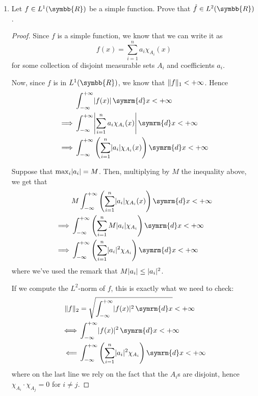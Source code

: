 \documentclass[a4paper, 12pt]{article}
\DeclarePairedDelimiter\abs{\lvert}{\rvert}%
\DeclarePairedDelimiter\norm{\lVert}{\rVert}%
\newcommand*\diff{\mathop{}\!\symrm{d}}
\newcommand*{\reals}{\symbb{R}}
\begin{document}
\begin{enumerate}
    \item Let \(f \in L^1 (\reals)\) be a simple function. Prove that \(\hat{f} \in L^2 (\reals)\).
    \begin{proof}
    Since \(f\) is a simple function, we know that we can write it as
    \[
        f(x) = \sum_{i = 1}^{n} a_i \chi_{A_i} (x)
    \]
    for some collection of disjoint measurable sets \(A_i\) and coefficients \(a_i\).
    
    Now, since \(f\) is in \(L^1 (\reals)\), we know that \(\norm{f}_1 < +\infty\). Hence
    \begin{align*}
        &\int_{-\infty}^{+\infty} \abs{f(x)} \diff x < +\infty \\
        \implies &\int_{-\infty}^{+\infty} \abs*{\sum_{i = 1}^{n} a_i \chi_{A_i} (x)} \diff x < +\infty \\
        \implies &\int_{-\infty}^{+\infty} \left(\sum_{i = 1}^{n} \abs{a_i} \chi_{A_i} (x)\right) \diff x < +\infty
    \end{align*}
    
    Suppose that \(\max_{i} \abs{a_i} = M\). Then, multiplying by \(M\) the inequality above, we get that
    \begin{align*}
        &M \int_{-\infty}^{+\infty} \left(\sum_{i = 1}^{n} \abs{a_i} \chi_{A_i} (x)\right) \diff x < +\infty \\
        \implies &\int_{-\infty}^{+\infty} \left(\sum_{i = 1}^{n} M \abs{a_i}{} \chi_{A_i}\right) \diff x < +\infty \\
        \implies &\int_{-\infty}^{+\infty} \left(\sum_{i = 1}^{n} \abs{a_i}^2 \chi_{A_i}\right) \diff x < +\infty 
    \end{align*}
    where we've used the remark that \(M \abs{a_i} \leq \abs{a_i}^2\).
    
    If we compute the \(L^2\)-norm of \(f\), this is exactly what we need to check:
    \begin{align*}
        \norm{f}_2 &= \sqrt{\int_{-\infty}^{+\infty} \abs{f(x)}^2 \diff x} < +\infty \\
        \iff &\int_{-\infty}^{+\infty} \abs{f(x)}^2 \diff x < +\infty \\
        \impliedby &\int_{-\infty}^{+\infty} \left(\sum_{i = 1}^n \abs{a_i}^2 \chi_{A_i}\right) \diff x < +\infty
    \end{align*}
    where on the last line we rely on the fact that the \(A_i\)s are disjoint, hence \(\chi_{A_i} \cdot \chi_{A_j} = 0\) for \(i \neq j\).
    

\end{proof}
\end{enumerate}
\end{document}
